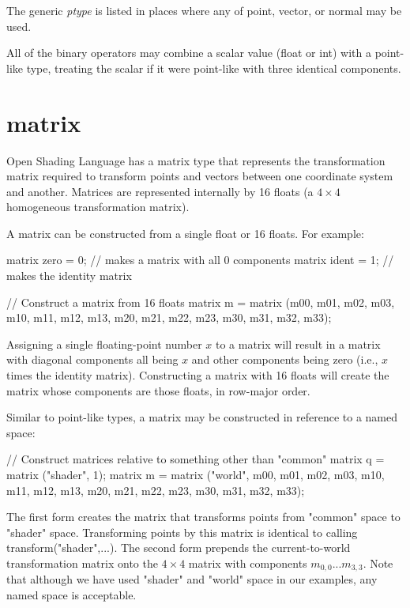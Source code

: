 \documentclass[11pt,letterpaper]{book}
\def\langname{Open Shading Language\xspace}
\def\float{{\cf float}\xspace}
\def\inttype{{\cf int}\xspace}
\def\matrix{{\cf matrix}\xspace}
\def\normal{{\cf normal}\xspace}
\def\point{{\cf point}\xspace}
\def\vector{{\cf vector}\xspace}
\def\commonspace{{\cf "common"} space\xspace}
\def\shaderspace{{\cf "shader"} space\xspace}
\begin{document}
\smallskip

\noindent The generic \emph{ptype} is listed in places where any
of \point, \vector, or \normal may be used.

All of the binary operators may combine a scalar value (\float or
\inttype) with a point-like type, treating the scalar if it were
point-like with three identical components.


\section{{\cf matrix}}
\label{sec:types:matrix}
 

\langname has a \matrix type that represents the transformation matrix
required to transform points and vectors between one coordinate system
and another.  Matrices are represented internally by 16 floats (a $4
\times 4$ homogeneous transformation matrix).

A \matrix can be constructed from a single float or 16 floats.  For
example:

\begin{code}
    matrix zero = 0;   // makes a matrix with all 0 components
    matrix ident = 1;  // makes the identity matrix

    // Construct a matrix from 16 floats
    matrix m = matrix (m00, m01, m02, m03, m10, m11, m12, m13, 
                       m20, m21, m22, m23, m30, m31, m32, m33);
\end{code}

\noindent Assigning a single floating-point number $x$ to a matrix will result
in a matrix with diagonal components all being $x$ and other
components being zero (i.e., $x$ times the identity matrix).
Constructing a matrix with 16 floats will create the matrix whose
components are those floats, in row-major order.  

Similar to point-like types, a {\cf matrix} may be constructed in
reference to a named space:

\begin{code}
    // Construct matrices relative to something other than "common"
    matrix q = matrix ("shader", 1);
    matrix m = matrix ("world", m00, m01, m02, m03, m10, m11, m12, m13, 
                               m20, m21, m22, m23, m30, m31, m32, m33);
\end{code}

\noindent The first form creates the matrix that transforms points from
\commonspace to \shaderspace.  Transforming points by this matrix
is identical to calling {\cf transform("shader",...)}.
The second form prepends the current-to-world transformation matrix
onto the $4 \times 4$ matrix with components $m_{0,0} ... m_{3,3}$.
Note that although we have used {\cf "shader"} and {\cf "world"}
space in our examples, any named space is acceptable.
\end{document}

